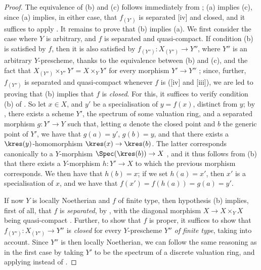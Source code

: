 \begin{proof}
The equivalence of (b) and (c) follows immediately from ;
(a) implies (c), since (a) implies, in either case, that $f_{(Y')}$ is separated [iv] and closed, and it suffices to apply .
It remains to prove that (b) implies (a).
We first consider the case where $Y$ is arbitrary, and $f$ is separated and quasi-compact.
If condition (b) is satisfied by $f$, then it is also satisfied by $f_{(Y'')}:X_{(Y'')}\to Y''$, where $Y''$ is an arbitrary $Y$-prescheme, thanks to the equivalence between (b) and (c), and the fact that $X_{(Y'')}\times_{Y''}Y' = X\times_Y Y'$ for every morphism $Y'\to Y''$ ;
since, further, $f_{(Y'')}$ is separated and quasi-compact whenever $f$ is ([iv] and [iii]), we are led to proving that (b) implies that $f$ is \emph{closed}.
For this, it suffices to verify condition (b) of .
So let $x\in X$, and $y'$ be a specialisation of $y=f(x)$, distinct from $y$;
by , there exists a scheme $Y'$, the spectrum of some valuation ring, and a separated morphism $g:Y'\to Y$ such that, letting $a$ denote the closed point and $b$ the generic point of $Y'$, we have that $g(a)=y'$, $g(b)=y$, and that there exists a $\kres(y)$-homomorphism $\kres(x)\to\kres(b)$.
The latter corresponds canonically to a $Y$-morphism $\Spec(\kres(b))\to X$ , and it thus follows from (b) that there exists a $Y$-morphism $h:Y'\to X$ to which the previous morphism corresponds.
We then have that $h(b)=x$;
if we set $h(a)=x'$, then $x'$ is a specialisation of $x$, and we have that $f(x')=f(h(a))=g(a)=y'$.

If now $Y$ is locally Noetherian and $f$ of finite type, then hypothesis (b) implies, first of all, that $f$ is \emph{separated}, by , with the diagonal morphism $X\to X\times_Y X$ being quasi-compact .
Further, to show that $f$ is proper, it suffices to show that $f_{(Y'')}:X_{(Y'')}\to Y''$ is \emph{closed} for every $Y$-prescheme $Y''$ \emph{of finite type}, taking  into account.
Since $Y''$ is then locally Noetherian, we can follow the same reasoning as in the first case by taking $Y'$ to be the spectrum of a discrete valuation ring, and applying  instead of .
\end{proof}

